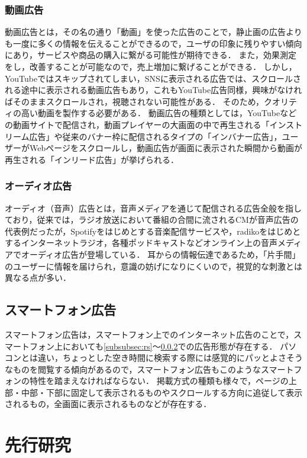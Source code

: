 \documentclass[12pt,a4j,titlepage]{ltjsarticle}
\begin{document}
\subsubsection{動画広告}
動画広告とは，その名の通り「動画」を使った広告のことで，静止画の広告よりも一度に多くの情報を伝えることができるので，ユーザの印象に残りやすい傾向にあり，サービスや商品の購入に繋がる可能性が期待できる．
また，効果測定をし，改善することが可能なので，売上増加に繋げることができる．
しかし，YouTubeではスキップされてしまい，SNSに表示される広告では、スクロールされる途中に表示される動画広告もあり，これもYouTube広告同様，興味がなければそのままスクロールされ，視聴されない可能性がある．
そのため，クオリティの高い動画を製作する必要がある．
動画広告の種類としては，YouTubeなどの動画サイトで配信され，動画プレイヤーの大画面の中で再生される「インストリーム広告」や従来のバナー枠に配信されるタイプの「インバナー広告」，ユーザーがWebページをスクロールし，動画広告が画面に表示された瞬間から動画が再生される「インリード広告」が挙げられる．

\subsubsection{オーディオ広告}
\label{subsubsec:ad}
オーディオ（音声）広告とは，音声メディアを通じて配信される広告全般を指しており，従来では，ラジオ放送において番組の合間に流されるCMが音声広告の代表例だったが，Spotifyをはじめとする音楽配信サービスや，radikoをはじめとするインターネットラジオ，各種ポッドキャストなどオンライン上の音声メディアでオーディオ広告が登場している．
耳からの情報伝達であるため，「片手間」のユーザーに情報を届けられ，意識の妨げになりにくいので，視覚的な刺激とは異なる点が多い．

\subsection{スマートフォン広告}
スマートフォン広告は，スマートフォン上でのインターネット広告のことで，スマートフォン上においても\ref{subsubsec:rs}～\ref{subsubsec:ad}での広告形態が存在する．
パソコンとは違い，ちょっとした空き時間に検索する際には感覚的にパッとよさそうなものを閲覧する傾向があるので，スマートフォン広告もこのようなスマートフォンの特性を踏まえなければならない．
掲載方式の種類も様々で，ページの上部・中部・下部に固定して表示されるものやスクロールする方向に追従して表示されるもの，全画面に表示されるものなどが存在する．

\clearpage

\section{先行研究}
\end{document}
